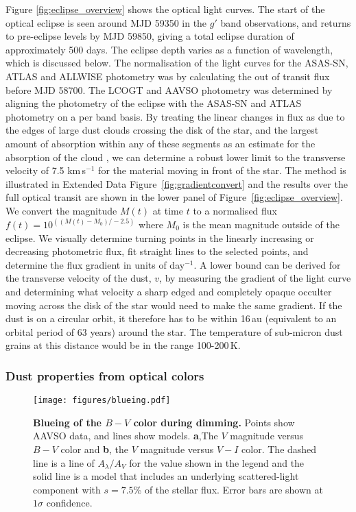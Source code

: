 \documentclass[sn-nature,oneside]{sn-jnl}%
\begin{document}
Figure \ref{fig:eclipse_overview} shows the optical light curves.
%
The start of the optical eclipse is seen around MJD 59350 in the $g'$ band observations, and returns to pre-eclipse levels by MJD 59850, giving a total eclipse duration of approximately 500 days.
%
The eclipse depth varies as a function of wavelength, which is discussed below.
%
The normalisation of the light curves for the ASAS-SN, ATLAS and ALLWISE photometry was by calculating the out of transit flux before MJD 58700.
%
The LCOGT and AAVSO photometry was determined by aligning the photometry of the eclipse with the ASAS-SN and ATLAS photometry on a per band basis.
%
By treating the linear changes in flux as due to the edges of large dust clouds crossing the disk of the star, and the largest amount of absorption within any of these segments as an estimate for the absorption of the cloud \citep[see equations 4.2 and 4.3 in ][]{Kennedy17}, we can determine a robust lower limit to the transverse velocity of 7.5 km\,s$^{-1}$ for the material moving in front of the star.
%
The method is illustrated in Extended Data Figure~\ref{fig:gradientconvert} and the results over the full optical transit are shown in the lower panel of Figure~\ref{fig:eclipse_overview}.
%
We convert the magnitude $M(t)$ at time $t$ to a normalised flux $f(t)=10^{\left(\left(M(t)-M_0\right)/-2.5\right)}$ where $M_0$ is the mean magnitude outside of the eclipse.
%
We visually determine turning points in the linearly increasing or decreasing photometric flux, fit straight lines to the selected points, and determine the flux gradient in units of day$^{-1}$.
%
A lower bound can be derived for the transverse velocity of the dust, $v$, by measuring the gradient of the light curve and determining what velocity a sharp edged and completely opaque occulter moving across the disk of the star would need to make the same gradient.
%
If the dust is on a circular orbit, it therefore has to be within 16\,au (equivalent to an orbital period of 63 years) around the star. The temperature of sub-micron dust grains at this distance would be in the range 100-200\,K.

\subsubsection*{Dust properties from optical colors}

\begin{figure}
    \centering
\texttt{[image: figures/blueing.pdf]}
    \caption{\textbf{Blueing of the $B-V$ color during dimming.}
    Points show AAVSO data, and lines show models.
    {\bf a},The $V$ magnitude versus $B-V$ color and {\bf b}, the  $V$ magnitude versus $V-I$ color.
    The dashed line is a line of $A_\lambda/A_V$ for the value shown in the legend and the solid line is a model that includes an underlying scattered-light component with $s=7.5$\% of the stellar flux.
    Error bars are shown at $1\sigma$ confidence.
}
        \label{fig:blueing}

\end{figure}
\end{document}
